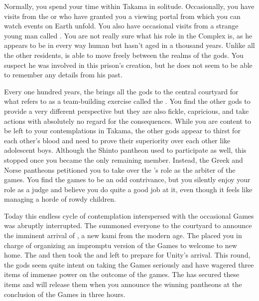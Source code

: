 \documentclass[char]{guardians}
\begin{document}
Normally, you spend your time within Takama in solitude. Occasionally, you have visits from the \cCaretaker{} or \cWarden{} who have granted you a viewing portal from which you can watch events on Earth unfold. You also have occasional visits from a strange young man called \cJascha{\intro}. You are not really sure what his role in the Complex is, as he appears to be in every way human but hasn't aged in a thousand years. Unlike all the other residents, \cJascha{} is able to move freely between the realms of the gods. You suspect he was involved in this prison's creation, but he does not seem to be able to remember any details from his past.

Every one hundred years, the \cCaretaker{} brings all the gods to the central courtyard for what \cCaretaker{\they} refers to as a team-building exercise called the \pGames{}. You find the other gods to provide a very different perspective but they are also fickle, capricious, and take actions with absolutely no regard for the consequences. While you are content to be left to your contemplations in Takama, the other gods appear to thirst for each other's blood and need to prove their superiority over each other like adolescent boys. Although the Shinto pantheon used to participate as well, this stopped once you became the only remaining member. Instead, the Greek and Norse pantheons petitioned you to take over the \cCaretaker{}'s role as the arbiter of the games. You find the games to be an odd contrivance, but you silently enjoy your role as a judge and believe you do quite a good job at it, even though it feels like managing a horde of rowdy children.

Today this endless cycle of contemplation interspersed with the occasional Games was abruptly interrupted. The \cCaretaker{} summoned everyone to the courtyard to announce the imminent arrival of \cUnity{}, a new kami from the modern age. The \cCaretaker{} placed you in charge of organizing an impromptu version of the Games to welcome \cUnity{} to \cUnity{\their} new home. The \cCaretaker{} and \cWarden{} then took the \stone{} and left to prepare for Unity's arrival. This round, the gods seem quite intent on taking the Games seriously and have wagered three items of immense power on the outcome of the games. The \cCaretaker{} has secured these items and will release them when you announce the winning pantheons at the conclusion of the Games in three hours.
\end{document}
